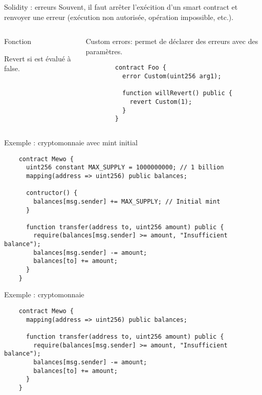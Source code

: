 \begin{frame}[fragile]{Solidity : erreurs}
  Souvent, il faut arrêter l'exécition d'un smart contract et renvoyer une erreur (exécution non autorisée, opération impossible, etc.).

  \begin{columns}
    \begin{column}{0.47\textwidth}
      Fonction 

      Revert si  est évalué à false.
    \end{column}
    \vspace{0.01\textwidth}
    \begin{column}{0.47\textwidth}
      Custom errors: permet de déclarer des erreurs avec des paramètres.

      \begin{verbatim}
        contract Foo {
          error Custom(uint256 arg1);

          function willRevert() public {
            revert Custom(1);
          }
        }
      \end{verbatim}
    \end{column}
  \end{columns}
\end{frame}

\begin{frame}[fragile]{Exemple : cryptomonnaie avec mint initial}
  \begin{verbatim}
    contract Mewo {
      uint256 constant MAX_SUPPLY = 1000000000; // 1 billion
      mapping(address => uint256) public balances;

      contructor() {
        balances[msg.sender] += MAX_SUPPLY; // Initial mint
      }

      function transfer(address to, uint256 amount) public {
        require(balances[msg.sender] >= amount, "Insufficient balance");
        balances[msg.sender] -= amount;
        balances[to] += amount;
      }
    }
  \end{verbatim}
\end{frame}

\begin{frame}[fragile]{Exemple : cryptomonnaie}
  \begin{verbatim}
    contract Mewo {
      mapping(address => uint256) public balances;

      function transfer(address to, uint256 amount) public {
        require(balances[msg.sender] >= amount, "Insufficient balance");
        balances[msg.sender] -= amount;
        balances[to] += amount;
      }
    }
  \end{verbatim}
\end{frame}

